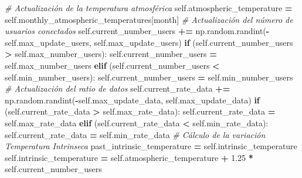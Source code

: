 \documentclass[
]{book}
\newenvironment{Shaded}{\begin{snugshade}}{\end{snugshade}}
\newcommand{\CommentTok}[1]{\textcolor[rgb]{0.56,0.35,0.01}{\textit{#1}}}
\newcommand{\ControlFlowTok}[1]{\textcolor[rgb]{0.13,0.29,0.53}{\textbf{#1}}}
\newcommand{\FloatTok}[1]{\textcolor[rgb]{0.00,0.00,0.81}{#1}}
\newcommand{\NormalTok}[1]{#1}
\newcommand{\OperatorTok}[1]{\textcolor[rgb]{0.81,0.36,0.00}{\textbf{#1}}}
\newcommand{\VariableTok}[1]{\textcolor[rgb]{0.00,0.00,0.00}{#1}}
\begin{document}
\begin{Shaded}
\begin{Highlighting}[]
        \CommentTok{\# Actualización de la temperatura atmosférica}
        \VariableTok{self}\NormalTok{.atmospheric\_temperature }\OperatorTok{=} 
                        \VariableTok{self}\NormalTok{.monthly\_atmospheric\_temperatures[month]}
        \CommentTok{\# Actualización del número de usuarios conectados}
        \VariableTok{self}\NormalTok{.current\_number\_users }\OperatorTok{+=}\NormalTok{ np.random.randint(}\OperatorTok{{-}}\VariableTok{self}\NormalTok{.max\_update\_users,}
                                                       \VariableTok{self}\NormalTok{.max\_update\_users)}
        \ControlFlowTok{if}\NormalTok{ (}\VariableTok{self}\NormalTok{.current\_number\_users }\OperatorTok{\textgreater{}} \VariableTok{self}\NormalTok{.max\_number\_users):}
            \VariableTok{self}\NormalTok{.current\_number\_users }\OperatorTok{=} \VariableTok{self}\NormalTok{.max\_number\_users}
        \ControlFlowTok{elif}\NormalTok{ (}\VariableTok{self}\NormalTok{.current\_number\_users }\OperatorTok{\textless{}} \VariableTok{self}\NormalTok{.min\_number\_users):}
            \VariableTok{self}\NormalTok{.current\_number\_users }\OperatorTok{=} \VariableTok{self}\NormalTok{.min\_number\_users}
        \CommentTok{\# Actualización del ratio de datos}
        \VariableTok{self}\NormalTok{.current\_rate\_data }\OperatorTok{+=}\NormalTok{ np.random.randint(}\OperatorTok{{-}}\VariableTok{self}\NormalTok{.max\_update\_data,}
                                                    \VariableTok{self}\NormalTok{.max\_update\_data)}
        \ControlFlowTok{if}\NormalTok{ (}\VariableTok{self}\NormalTok{.current\_rate\_data }\OperatorTok{\textgreater{}} \VariableTok{self}\NormalTok{.max\_rate\_data):}
            \VariableTok{self}\NormalTok{.current\_rate\_data }\OperatorTok{=} \VariableTok{self}\NormalTok{.max\_rate\_data}
        \ControlFlowTok{elif}\NormalTok{ (}\VariableTok{self}\NormalTok{.current\_rate\_data }\OperatorTok{\textless{}} \VariableTok{self}\NormalTok{.min\_rate\_data):}
            \VariableTok{self}\NormalTok{.current\_rate\_data }\OperatorTok{=} \VariableTok{self}\NormalTok{.min\_rate\_data}
        \CommentTok{\# Cálculo de la variación Temperatura Intrinseca}
\NormalTok{        past\_intrinsic\_temperature }\OperatorTok{=} \VariableTok{self}\NormalTok{.intrinsic\_temperature}
        \VariableTok{self}\NormalTok{.intrinsic\_temperature }\OperatorTok{=} \VariableTok{self}\NormalTok{.atmospheric\_temperature}
                                     \OperatorTok{+} \FloatTok{1.25} \OperatorTok{*} \VariableTok{self}\NormalTok{.current\_number\_users}

\end{Highlighting}
\end{Shaded}
\end{document}
